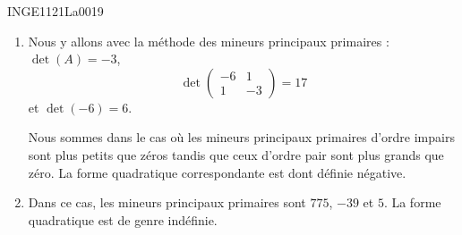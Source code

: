 

\begin{corrige}{INGE1121La0019}

	\begin{enumerate}

		\item
					
		Nous y allons avec la méthode des mineurs principaux primaires : $\det(A)=-3$,
        \begin{equation}
        \det\begin{pmatrix}
			-6	&	1	\\ 
			1	&	-3	
		\end{pmatrix}=17
        \end{equation}
        et $\det(-6)=6$.
	
		Nous sommes dans le cas où les mineurs principaux primaires d'ordre impairs sont plus petits que zéros tandis que ceux d'ordre pair sont plus grands que zéro. La forme quadratique correspondante est dont définie négative.
	
	\item
		Dans ce cas, les mineurs principaux primaires sont $775$, $-39$ et $5$. La forme quadratique est de genre indéfinie.

	\end{enumerate}

\end{corrige}
